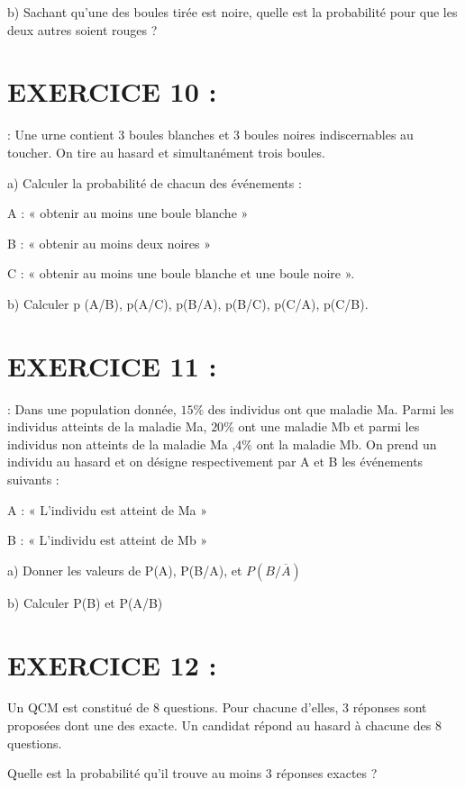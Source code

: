 \documentclass[12pt]{article}
\begin{document}
b) Sachant qu’une des boules tirée est noire, quelle est la probabilité pour que les deux autres soient rouges ?
\section*{EXERCICE 10 :} : Une urne contient 3 boules blanches et 3 boules noires indiscernables au toucher. On tire au hasard et simultanément trois boules.

a) Calculer la probabilité de chacun des événements : 

A : « obtenir au moins une boule blanche »

B : « obtenir au moins deux noires » 

C : « obtenir au moins une boule blanche et une boule noire ».

b) Calculer p (A/B), p(A/C), p(B/A), p(B/C), p(C/A), p(C/B).
\section*{EXERCICE 11 :}: Dans une population donnée, $15\%$ des individus ont que maladie Ma. Parmi les individus atteints de la maladie Ma, $20\%$ ont une maladie Mb et parmi les individus non atteints de la maladie  Ma ,$4\%$ ont la maladie Mb.
On prend un individu au hasard et on désigne respectivement par A et B les événements suivants :
 
A : « L’individu est atteint de Ma »

B : « L’individu est  atteint de Mb  »

a) Donner les valeurs de P(A), P(B/A), et $P(B/\overline{A})$

b) Calculer P(B) et P(A/B)
\section*{EXERCICE 12 :}
Un QCM est constitué de 8 questions. Pour chacune d’elles, 3 réponses sont proposées dont une des exacte. Un candidat répond au hasard à chacune des 8 questions.

Quelle est la probabilité qu’il trouve au moins 3 réponses exactes ?    
\end{document}
